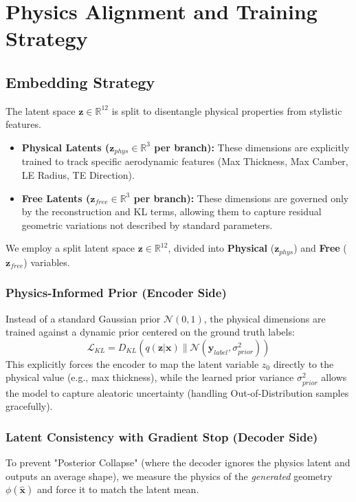 \documentclass[11pt, a4paper]{article}
\begin{document}
\section{Physics Alignment and Training Strategy}

\subsection{Embedding Strategy}
The latent space $\mathbf{z} \in \mathbb{R}^{12}$ is split to disentangle physical properties from stylistic features.
\begin{itemize}
    \item \textbf{Physical Latents ($\mathbf{z}_{phys} \in \mathbb{R}^3$ per branch):} These dimensions are explicitly trained to track specific aerodynamic features (Max Thickness, Max Camber, LE Radius, TE Direction).
    \item \textbf{Free Latents ($\mathbf{z}_{free} \in \mathbb{R}^3$ per branch):} These dimensions are governed only by the reconstruction and KL terms, allowing them to capture residual geometric variations not described by standard parameters.
\end{itemize}

We employ a split latent space $\mathbf{z} \in \mathbb{R}^{12}$, divided into \textbf{Physical} ($\mathbf{z}_{phys}$) and \textbf{Free} ($\mathbf{z}_{free}$) variables.

\subsubsection{Physics-Informed Prior (Encoder Side)}
Instead of a standard Gaussian prior $\mathcal{N}(0, 1)$, the physical dimensions are trained against a dynamic prior centered on the ground truth labels:
\begin{equation}
    \mathcal{L}_{KL} = D_{KL}\left( q(\mathbf{z}|\mathbf{x}) \parallel \mathcal{N}(\mathbf{y}_{label}, \sigma_{prior}^2) \right)
\end{equation}
This explicitly forces the encoder to map the latent variable $z_0$ directly to the physical value (e.g., max thickness), while the learned prior variance $\sigma_{prior}^2$ allows the model to capture aleatoric uncertainty (handling Out-of-Distribution samples gracefully).

\subsubsection{Latent Consistency with Gradient Stop (Decoder Side)}
To prevent "Posterior Collapse" (where the decoder ignores the physics latent and outputs an average shape), we measure the physics of the \textit{generated} geometry $\phi(\hat{\mathbf{x}})$ and force it to match the latent mean.
\end{document}
